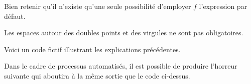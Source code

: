 \documentclass[10pt, a4paper]{tutodoc}
\begin{document}
\begin{tdocwarn}
    Bien retenir qu'il n'existe qu'une seule possibilité d'employer $f$ l'expression par défaut.
\end{tdocwarn}




\begin{tdocnote}
    Les espaces autour des doubles points et des virgules ne sont pas obligatoires.
\end{tdocnote}




Voici un code fictif illustrant les explications précédentes.



Dans le cadre de processus automatisés, il est possible de produire l'horreur suivante qui aboutira à la même sortie que le code ci-dessus.

\end{document}
